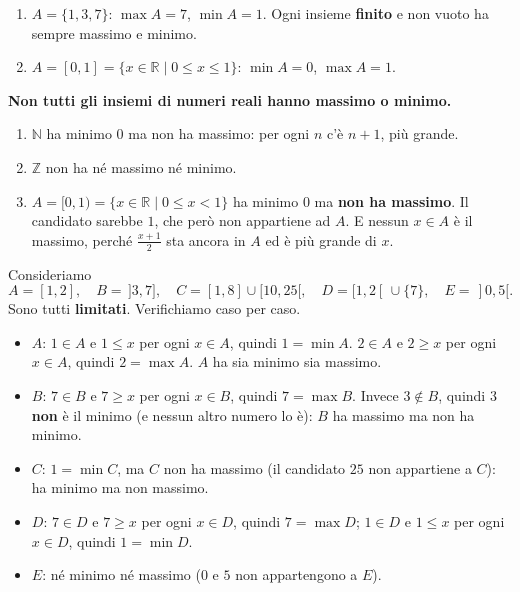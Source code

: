 \documentclass[11pt,a4paper]{article}
\begin{document}
\begin{esempio}
\leavevmode
\begin{enumerate}
    \item $A = \{1, 3, 7\}$: $\max A = 7$, $\min A = 1$. Ogni insieme
          \textbf{finito} e non vuoto ha sempre massimo e minimo.
    \item $A = [0, 1] = \{x \in \mathbb{R} \mid 0 \leq x \leq 1\}$:
          $\min A = 0$, $\max A = 1$.
\end{enumerate}
\end{esempio}

\textbf{Non tutti gli insiemi di numeri reali hanno massimo o minimo.}

\begin{esempio}
\leavevmode
\begin{enumerate}
    \item $\mathbb{N}$ ha minimo $0$ ma non ha massimo: per ogni $n$ c'è
          $n + 1$, più grande.
    \item $\mathbb{Z}$ non ha né massimo né minimo.
    \item $A = [0, 1) = \{x \in \mathbb{R} \mid 0 \leq x < 1\}$ ha minimo
          $0$ ma \textbf{non ha massimo}. Il candidato sarebbe $1$, che però
          non appartiene ad $A$. E nessun $x \in A$ è il massimo, perché
          $\frac{x + 1}{2}$ sta ancora in $A$ ed è più grande di $x$.
\end{enumerate}
\end{esempio}


\begin{esempio}
Consideriamo
\[
A = [1, 2], \quad B = \,]3, 7], \quad C = [1, 8] \cup [10, 25[, \quad
D = [1, 2[ \,\cup \{7\}, \quad E = \,]0, 5[.
\]
Sono tutti \textbf{limitati}. Verifichiamo caso per caso.
\begin{itemize}
    \item $A$: $1 \in A$ e $1 \leq x$ per ogni $x \in A$, quindi $1 = \min A$.
          $2 \in A$ e $2 \geq x$ per ogni $x \in A$, quindi $2 = \max A$.
          $A$ ha sia minimo sia massimo.
    \item $B$: $7 \in B$ e $7 \geq x$ per ogni $x \in B$, quindi $7 = \max B$.
          Invece $3 \notin B$, quindi $3$ \textbf{non} è il minimo (e nessun altro
          numero lo è): $B$ ha massimo ma non ha minimo.
    \item $C$: $1 = \min C$, ma $C$ non ha massimo (il candidato $25$ non
          appartiene a $C$): ha minimo ma non massimo.
    \item $D$: $7 \in D$ e $7 \geq x$ per ogni $x \in D$, quindi $7 = \max D$;
          $1 \in D$ e $1 \leq x$ per ogni $x \in D$, quindi $1 = \min D$.
    \item $E$: né minimo né massimo ($0$ e $5$ non appartengono a $E$).
\end{itemize}
\end{esempio}
\end{document}
